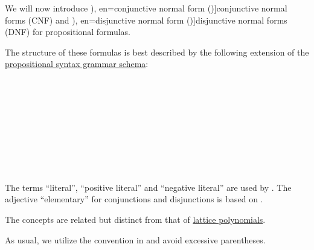 \begin{definition}\label{def:cnf_and_dnf}\mimprovised
  We will now introduce \term[ru=конъюнктивная нормальная форма (\cite[def. 6.2]{Эдельман1975}), en=conjunctive normal form (\cite[def. 1.3.10]{Hinman2005})]{conjunctive normal forms} (CNF) and \term[ru=дизъюнктивная нормальная форма (\cite[def. 6.2]{Эдельман1975}), en=disjunctive normal form (\cite[def. 1.3.10]{Hinman2005})]{disjunctive normal forms} (DNF) for propositional formulas.

  The structure of these formulas is best described by the following extension of the \hyperref[def:propositional_grammar_schema_schema]{propositional syntax grammar schema}:
  \begin{bnf*}
           {} \\
           {\synneg {}} \\
                    {       \bnfor {}} \\
     { \bnfor} \\
     \\
                        { \bnfor \bnftsq{(} \bnfsp {}              \bnfsp \bnftsq{\( \synwedge \)} \bnfsp {}             \bnfsp \bnftsq{)}} \\
     { \bnfor} \\
     \\
                        { \bnfor \bnftsq{(} \bnfsp {}              \bnfsp \bnftsq{\( \synvee \)}   \bnfsp {}             \bnfsp \bnftsq{)}}
  \end{bnf*}
\end{definition}
\begin{comments}
  \item The terms \enquote{literal}, \enquote{positive literal} and \enquote{negative literal} are used by . The adjective \enquote{elementary} for conjunctions and disjunctions is based on \cite[36]{Эдельман1975}.
  \item The concepts are related but distinct from that of \hyperref[rem:lattice_polynomials]{lattice polynomials}.
  \item As usual, we utilize the convention in  and avoid excessive parentheses.
\end{comments}

